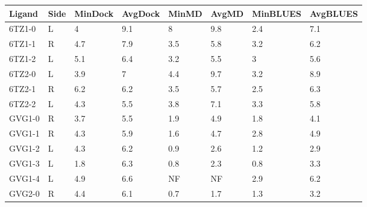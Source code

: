 \begin{table}[]
\begin{tabular}{|l|l|l|l|l|l|l|l|}
\hline
\rowcolor[HTML]{9B9B9B} 
\textbf{Ligand} & \textbf{Side} & \textbf{MinDock} & \textbf{AvgDock} & \textbf{MinMD} & \textbf{AvgMD} & \textbf{MinBLUES} & \textbf{AvgBLUES} \\ \hline
6TZ1-0          & L             & 4                & 9.1              & 8              & 9.8            & 2.4               & 7.1               \\ \hline
6TZ1-1          & R             & 4.7              & 7.9              & 3.5            & 5.8            & 3.2               & 6.2               \\ \hline
6TZ1-2          & L             & 5.1              & 6.4              & 3.2            & 5.5            & 3                 & 5.6               \\ \hline
6TZ2-0          & L             & 3.9              & 7                & 4.4            & 9.7            & 3.2               & 8.9               \\ \hline
6TZ2-1          & R             & 6.2              & 6.2              & 3.5            & 5.7            & 2.5               & 6.3               \\ \hline
6TZ2-2          & L             & 4.3              & 5.5              & 3.8            & 7.1            & 3.3               & 5.8               \\ \hline
GVG1-0          & R             & 3.7              & 5.5              & 1.9            & 4.9            & 1.8               & 4.1               \\ \hline
GVG1-1          & R             & 4.3              & 5.9              & 1.6            & 4.7            & 2.8               & 4.9               \\ \hline
GVG1-2          & L             & 4.3              & 6.2              & 0.9            & 2.6            & 1.2               & 2.9               \\ \hline
GVG1-3          & L             & 1.8              & 6.3              & 0.8            & 2.3            & 0.8               & 3.3               \\ \hline
GVG1-4          & L             & 4.9              & 6.6              &  NF            & NF             & 2.9               & 6.2               \\ \hline
GVG2-0          & R             & 4.4              & 6.1              & 0.7            & 1.7            & 1.3               & 3.2               \\ \hline

\end{tabular}
\end{table}
